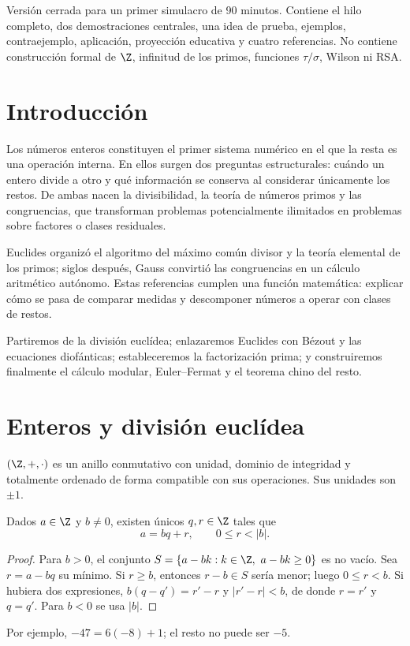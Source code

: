 \documentclass[10pt,a4paper]{article}
\begin{document}

\begin{idea}
Versión cerrada para un primer simulacro de 90 minutos. Contiene el hilo completo, dos demostraciones centrales, una idea de prueba, ejemplos, contraejemplo, aplicación, proyección educativa y cuatro referencias. No contiene construcción formal de $\Z$, infinitud de los primos, funciones $\tau/\sigma$, Wilson ni RSA.
\end{idea}

\section{Introducción}
Los números enteros constituyen el primer sistema numérico en el que la resta es una operación interna. En ellos surgen dos preguntas estructurales: cuándo un entero divide a otro y qué información se conserva al considerar únicamente los restos. De ambas nacen la divisibilidad, la teoría de números primos y las congruencias, que transforman problemas potencialmente ilimitados en problemas sobre factores o clases residuales.

Euclides organizó el algoritmo del máximo común divisor y la teoría elemental de los primos; siglos después, Gauss convirtió las congruencias en un cálculo aritmético autónomo. Estas referencias cumplen una función matemática: explicar cómo se pasa de comparar medidas y descomponer números a operar con clases de restos.

Partiremos de la división euclídea; enlazaremos Euclides con Bézout y las ecuaciones diofánticas; estableceremos la factorización prima; y construiremos finalmente el cálculo modular, Euler--Fermat y el teorema chino del resto.

\section{Enteros y división euclídea}
$(\Z,+,\cdot)$ es un anillo conmutativo con unidad, dominio de integridad y totalmente ordenado de forma compatible con sus operaciones. Sus unidades son $\pm1$.

\begin{teorema}
Dados $a\in\Z$ y $b\ne0$, existen únicos $q,r\in\Z$ tales que
\[
a=bq+r,\qquad 0\le r<|b|.
\]
\end{teorema}
\begin{proof}
Para $b>0$, el conjunto $S=\{a-bk:k\in\Z,\ a-bk\ge0\}$ es no vacío. Sea $r=a-bq$ su mínimo. Si $r\ge b$, entonces $r-b\in S$ sería menor; luego $0\le r<b$. Si hubiera dos expresiones, $b(q-q')=r'-r$ y $|r'-r|<b$, de donde $r=r'$ y $q=q'$. Para $b<0$ se usa $|b|$.
\end{proof}
Por ejemplo, $-47=6(-8)+1$; el resto no puede ser $-5$.
\end{document}
